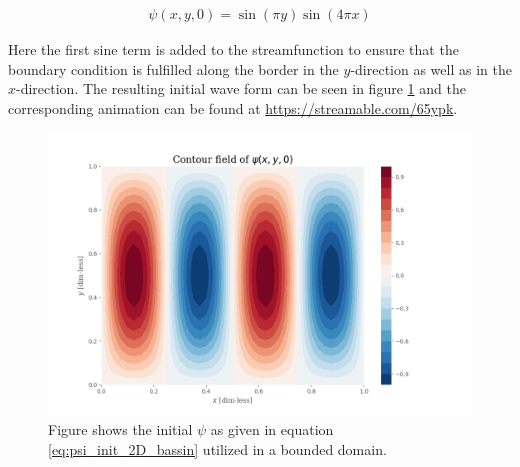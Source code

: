 \documentclass[12pt]{article}
\numberwithin{figure}{section}
\numberwithin{table}{section}
\begin{document}
\begin{eqnarray}
	\psi (x,y,0) = \sin(\pi y) \sin(4 \pi x)
    \label{eq:psi_init_2D_bassin}
\end{eqnarray}

\noindent Here the first sine term is added to the streamfunction to ensure that the boundary condition is fulfilled along the border in the $y$-direction as well as in the $x$-direction. The resulting initial wave form can be seen in figure \ref{fig:2d_bassin} and the corresponding animation can be found at \url{https://streamable.com/65ypk}.

\begin{figure}[ht!]
 \centerline{\includegraphics[scale = 0.50]{psi0_2d_basin.png}}
 \caption{Figure shows the initial $\psi$ as given in equation \eqref{eq:psi_init_2D_bassin} utilized in a bounded domain.}
 \label{fig:2d_bassin}
\end{figure}
\end{document}
